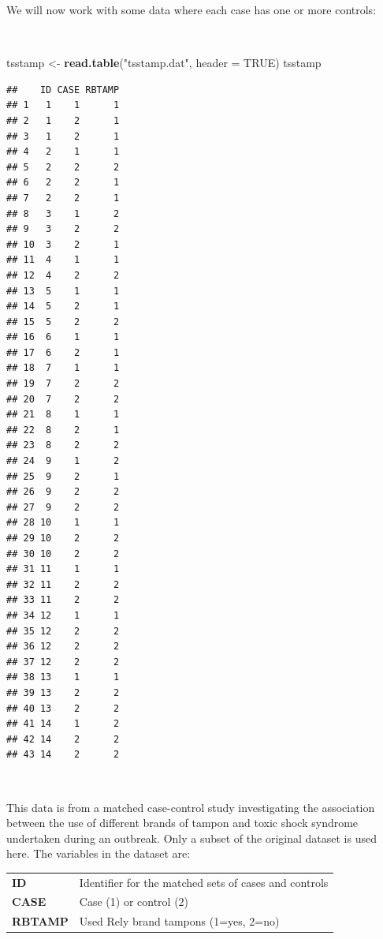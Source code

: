 \documentclass[12pt,a4paper]{book}
\newenvironment{Shaded}{\begin{snugshade}}{\end{snugshade}}
\newcommand{\DataTypeTok}[1]{\textcolor[rgb]{0.13,0.29,0.53}{#1}}
\newcommand{\KeywordTok}[1]{\textcolor[rgb]{0.13,0.29,0.53}{\textbf{#1}}}
\newcommand{\NormalTok}[1]{#1}
\newcommand{\OtherTok}[1]{\textcolor[rgb]{0.56,0.35,0.01}{#1}}
\newcommand{\StringTok}[1]{\textcolor[rgb]{0.31,0.60,0.02}{#1}}
\theoremstyle{definition}
\theoremstyle{definition}
\theoremstyle{definition}
\theoremstyle{remark}
\begin{document}
We will now work with some data where each case has one or more
controls:

~

\begin{Shaded}
\begin{Highlighting}[]
\NormalTok{tsstamp <-}\StringTok{ }\KeywordTok{read.table}\NormalTok{(}\StringTok{"tsstamp.dat"}\NormalTok{, }\DataTypeTok{header =} \OtherTok{TRUE}\NormalTok{)}
\NormalTok{tsstamp}
\end{Highlighting}
\end{Shaded}

\begin{verbatim}
##    ID CASE RBTAMP
## 1   1    1      1
## 2   1    2      1
## 3   1    2      1
## 4   2    1      1
## 5   2    2      2
## 6   2    2      1
## 7   2    2      1
## 8   3    1      2
## 9   3    2      2
## 10  3    2      1
## 11  4    1      1
## 12  4    2      2
## 13  5    1      1
## 14  5    2      1
## 15  5    2      2
## 16  6    1      1
## 17  6    2      1
## 18  7    1      1
## 19  7    2      2
## 20  7    2      2
## 21  8    1      1
## 22  8    2      1
## 23  8    2      2
## 24  9    1      2
## 25  9    2      1
## 26  9    2      2
## 27  9    2      2
## 28 10    1      1
## 29 10    2      2
## 30 10    2      2
## 31 11    1      1
## 32 11    2      2
## 33 11    2      2
## 34 12    1      1
## 35 12    2      2
## 36 12    2      2
## 37 12    2      2
## 38 13    1      1
## 39 13    2      2
## 40 13    2      2
## 41 14    1      2
## 42 14    2      2
## 43 14    2      2
\end{verbatim}

~

This data is from a matched case-control study investigating the
association between the use of different brands of tampon and toxic
shock syndrome undertaken during an outbreak. Only a subset of the
original dataset is used here. The variables in the dataset are:

\newpage

\begin{longtable}[]{@{}ll@{}}
\toprule
\endhead
\begin{minipage}[t]{0.20\columnwidth}\raggedright
\textbf{ID}\strut
\end{minipage} & \begin{minipage}[t]{0.75\columnwidth}\raggedright
Identifier for the matched sets of cases and controls\strut
\end{minipage}\tabularnewline
\begin{minipage}[t]{0.20\columnwidth}\raggedright
\textbf{CASE}\strut
\end{minipage} & \begin{minipage}[t]{0.75\columnwidth}\raggedright
Case (1) or control (2)\strut
\end{minipage}\tabularnewline
\begin{minipage}[t]{0.20\columnwidth}\raggedright
\textbf{RBTAMP}\strut
\end{minipage} & \begin{minipage}[t]{0.75\columnwidth}\raggedright
Used Rely brand tampons (1=yes, 2=no)\strut
\end{minipage}\tabularnewline
\bottomrule
\end{longtable}
\end{document}
